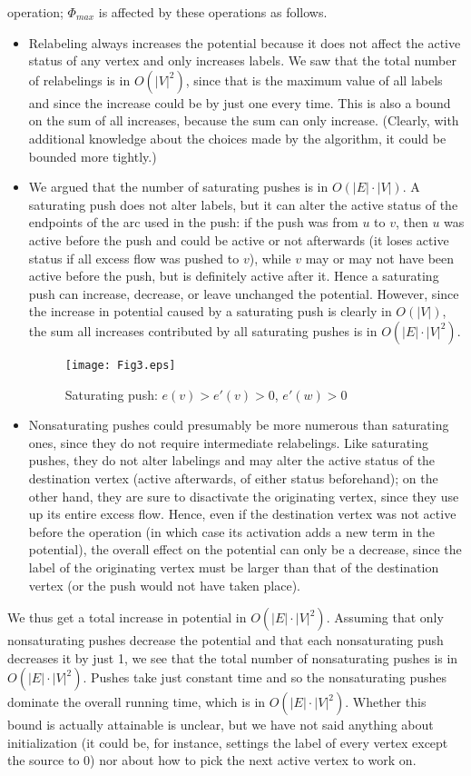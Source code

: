 \documentclass{article}
\begin{document}
operation; $\Phi_{max}$ is affected by these operations as follows.
\begin{itemize}
  \itemsep 0pt
  \item
    Relabeling always increases the potential because it does not
    affect the active status of any vertex and only increases labels.
    We saw that the total number of relabelings is in $O(|V|^2)$,
    since that is the maximum value of all labels and since the increase
    could be by just one every time.  This is also a bound on the sum of
    all increases, because the sum can only increase.
    (Clearly, with additional knowledge about the choices made
    by the algorithm, it could be bounded more tightly.)
  \item
    We argued that the number of saturating pushes is in $O(|E|\cdot |V|)$.
    A saturating push does not alter labels, but it can alter the active
    status of the endpoints of the arc used in the push: if the push was
    from $u$ to $v$, then $u$ was active before the push and could be
    active or not afterwards (it loses active status if all excess flow
    was pushed to $v$), while $v$ may or may not have been active before
    the push, but is definitely active after it.  Hence a saturating push
    can increase, decrease, or leave unchanged the potential.   However,
    since the increase in potential caused by a saturating push is clearly
    in $O(|V|)$, the sum all increases contributed by all saturating pushes
    is in $O(|E|\cdot |V|^2)$.
    \begin{figure}[h]%
      \centering\texttt{[image: Fig3.eps]}%
      \caption{Saturating push: $e(v)> e'(v) > 0$, $e'(w) > 0$}%
      \label{fig:Fig3}%
    \end{figure}%
  \item
    Nonsaturating pushes could presumably be more numerous than saturating
    ones, since they do not require intermediate relabelings.  Like saturating
    pushes, they do not alter labelings and may alter the active status of the
    destination vertex (active afterwards, of either status beforehand); on the
    other hand, they are sure to disactivate the originating vertex, since they
    use up its entire excess flow.  Hence, even if the destination vertex was
    not active before the operation (in which case its activation adds a new
    term in the potential), the overall effect on the potential can only be a
    decrease, since the label of the originating vertex must be larger than
    that of the destination vertex (or the push would not have taken place).
\end{itemize}
We thus get a total increase in potential in $O(|E|\cdot |V|^2)$.  Assuming
that only nonsaturating pushes decrease the potential and that each
nonsaturating push decreases it by just 1, we see that the total number
of nonsaturating pushes is in $O(|E|\cdot |V|^2)$.  Pushes take just
constant time and so the nonsaturating pushes dominate the overall 
running time, which is in $O(|E|\cdot |V|^2)$.  Whether this bound
is actually attainable is unclear, but we have not said anything about
initialization (it could be, for instance, settings the label of every
vertex except the source to $0$) nor about how to pick the next active
vertex to work on.
\end{document}
